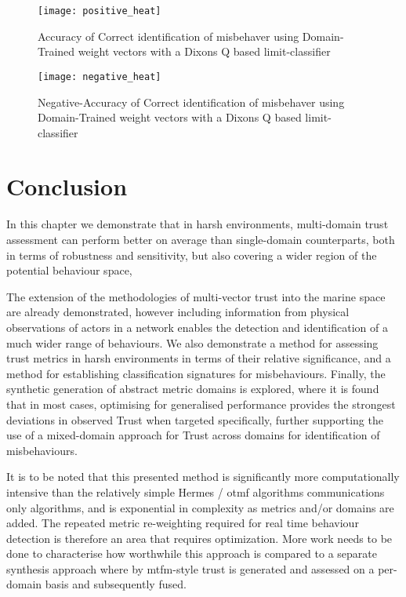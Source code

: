 \begin{figure}
	\centering
	\texttt{[image: positive\_heat]}
	\caption{Accuracy of Correct identification of misbehaver using Domain-Trained weight vectors with a Dixons Q based limit-classifier}
	\label{fig:positive_heat}
\end{figure}

\begin{figure}
	\centering
	\texttt{[image: negative\_heat]}
	\caption{Negative-Accuracy of Correct identification of misbehaver using Domain-Trained weight vectors with a Dixons Q based limit-classifier}
	\label{fig:negative_heat}
\end{figure}


\section{Conclusion}
In this chapter we demonstrate that in harsh environments, multi-domain trust assessment can perform better on average than single-domain counterparts, both in terms of robustness and sensitivity, but also covering a wider region of the potential behaviour space, 

The extension of the methodologies of multi-vector trust into the marine space are already demonstrated, however including information from physical observations of actors in a network enables the detection and identification of a much wider range of behaviours.
We also demonstrate a method for assessing trust metrics in harsh environments in terms of their relative significance, and a method for establishing classification signatures for misbehaviours.
Finally, the synthetic generation of abstract metric domains is explored, where it is found that in most cases, optimising for generalised performance provides the strongest deviations in observed Trust when targeted specifically, further supporting the use of a mixed-domain approach for Trust across domains for identification of misbehaviours.

It is to be noted that this presented method is significantly more computationally intensive than the relatively simple Hermes / \gls{otmf} algorithms communications only algorithms, and is exponential in complexity as metrics and/or domains are added. The repeated metric re-weighting required for real time behaviour detection is therefore an area that requires optimization. More work needs to be done to characterise how worthwhile this approach is compared to a separate synthesis approach where by \gls{mtfm}-style trust is generated and assessed on a per-domain basis and subsequently fused.

